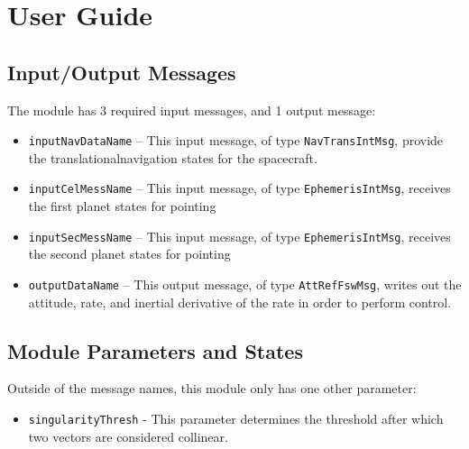 
\section{User Guide}
\subsection{Input/Output Messages}
The module has 3 required input messages, and 1 output message:
\begin{itemize}
	\item {\tt inputNavDataName} -- This input message, of type {\tt NavTransIntMsg}, provide the translationalnavigation states for the spacecraft.
	\item {\tt inputCelMessName} -- This input message, of type {\tt EphemerisIntMsg}, receives the first planet states for pointing
	\item {\tt inputSecMessName} -- This input message, of type {\tt EphemerisIntMsg}, receives the second planet states for pointing
	\item {\tt outputDataName} -- This output message, of type {\tt AttRefFswMsg}, writes out the attitude, rate, and inertial derivative of the rate in order to perform control. 
\end{itemize}

\subsection{Module Parameters and States}
Outside of the message names, this module only has one other parameter:
\begin{itemize}
	\item {\tt singularityThresh} - This parameter determines the threshold after which two vectors are considered collinear. 
\end{itemize}

